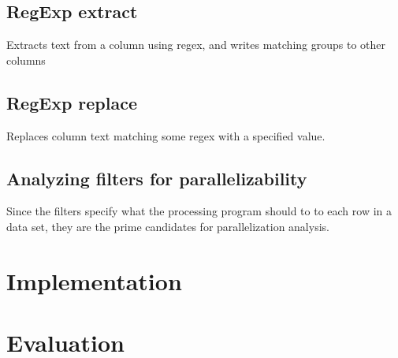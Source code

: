 \subsection{RegExp extract}
Extracts text from a column using regex, and writes matching groups to other columns

\subsection{RegExp replace}
Replaces column text matching some regex with a specified value.

\subsection{Analyzing filters for parallelizability}
Since the filters specify what the processing program should to to each row in a data set, they are the prime candidates for parallelization analysis.

\section{Implementation}

\section{Evaluation}
